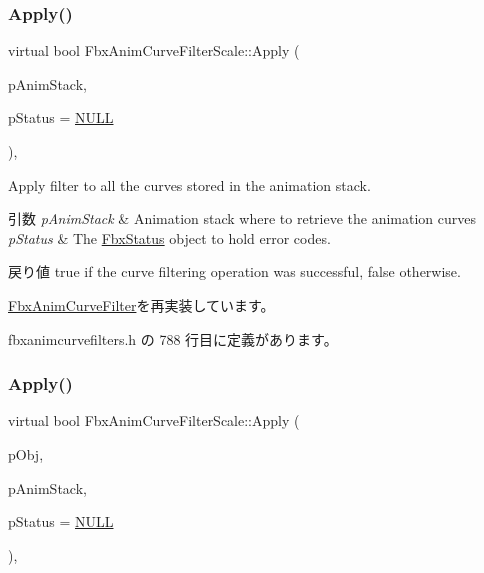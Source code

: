 \subsubsection{\texorpdfstring{Apply()}{Apply()}\hspace{0.1cm}{\footnotesize\ttfamily [1/5]}}
{\footnotesize\ttfamily virtual bool Fbx\+Anim\+Curve\+Filter\+Scale\+::\+Apply (\begin{DoxyParamCaption}\item[{\hyperlink{class_fbx_anim_stack}{Fbx\+Anim\+Stack} $\ast$}]{p\+Anim\+Stack,  }\item[{\hyperlink{class_fbx_status}{Fbx\+Status} $\ast$}]{p\+Status = {\ttfamily \hyperlink{fbxarch_8h_a070d2ce7b6bb7e5c05602aa8c308d0c4}{N\+U\+LL}} }\end{DoxyParamCaption})\hspace{0.3cm}{\ttfamily [inline]}, {\ttfamily [virtual]}}

Apply filter to all the curves stored in the animation stack. 
\begin{DoxyParams}{引数}
{\em p\+Anim\+Stack} & Animation stack where to retrieve the animation curves \\
\hline
{\em p\+Status} & The \hyperlink{class_fbx_status}{Fbx\+Status} object to hold error codes. \\
\hline
\end{DoxyParams}
\begin{DoxyReturn}{戻り値}
{\ttfamily true} if the curve filtering operation was successful, {\ttfamily false} otherwise. 
\end{DoxyReturn}


\hyperlink{class_fbx_anim_curve_filter_aef3900e6180e05661c27ee484ae939c3}{Fbx\+Anim\+Curve\+Filter}を再実装しています。



 fbxanimcurvefilters.\+h の 788 行目に定義があります。

\mbox{\label{class_fbx_anim_curve_filter_scale_acaecc7335471ad618e0cc7e02625dbec}} 
\subsubsection{\texorpdfstring{Apply()}{Apply()}\hspace{0.1cm}{\footnotesize\ttfamily [2/5]}}
{\footnotesize\ttfamily virtual bool Fbx\+Anim\+Curve\+Filter\+Scale\+::\+Apply (\begin{DoxyParamCaption}\item[{\hyperlink{class_fbx_object}{Fbx\+Object} $\ast$}]{p\+Obj,  }\item[{\hyperlink{class_fbx_anim_stack}{Fbx\+Anim\+Stack} $\ast$}]{p\+Anim\+Stack,  }\item[{\hyperlink{class_fbx_status}{Fbx\+Status} $\ast$}]{p\+Status = {\ttfamily \hyperlink{fbxarch_8h_a070d2ce7b6bb7e5c05602aa8c308d0c4}{N\+U\+LL}} }\end{DoxyParamCaption})\hspace{0.3cm}{\ttfamily [inline]}, {\ttfamily [virtual]}}

